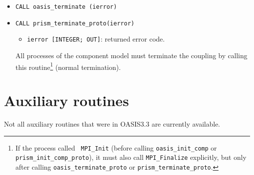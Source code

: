\begin{itemize}

\item {\tt CALL oasis\_terminate       (ierror)}
\item {\tt CALL prism\_terminate\_proto(ierror)}
  \begin{itemize}
  \item {\tt ierror [INTEGER; OUT]}: returned error code.
  \end{itemize}
  All processes of the component model must terminate the coupling by
  calling this routine\footnote{If the process called {\tt
  MPI\_Init} (before calling {\tt oasis\_init\_comp} or {\tt prism\_init\_comp\_proto}), it must
  also call {\tt MPI\_Finalize} explicitly, but only after calling
  {\tt oasis\_terminate\_proto} or {\tt prism\_terminate\_proto}.} (normal termination). 

\end{itemize}


\section{Auxiliary routines}
\label{subsubsec_auxroutines}

Not all auxiliary routines that were in OASIS3.3 are currently available.


